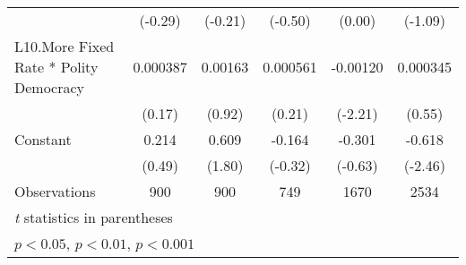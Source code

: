 {\begin{longtable}{l*{5}{c}}
                &  (-0.29)         &  (-0.21)         &  (-0.50)         &   (0.00)         &  (-1.09)         \\
[1em]
L10.More Fixed Rate * Polity Democracy& 0.000387         &  0.00163         & 0.000561         & -0.00120\sym{*}  & 0.000345         \\
                &   (0.17)         &   (0.92)         &   (0.21)         &  (-2.21)         &   (0.55)         \\
[1em]
Constant        &    0.214         &    0.609         &   -0.164         &   -0.301         &   -0.618\sym{*}  \\
                &   (0.49)         &   (1.80)         &  (-0.32)         &  (-0.63)         &  (-2.46)         \\
\hline
Observations    &      900         &      900         &      749         &     1670         &     2534         \\
\hline\hline
\multicolumn{6}{l}{\footnotesize \textit{t} statistics in parentheses}\\
\multicolumn{6}{l}{\footnotesize \sym{*} \(p<0.05\), \sym{**} \(p<0.01\), \sym{***} \(p<0.001\)}\\
\end{longtable}
}
